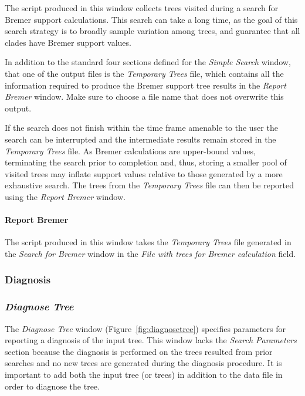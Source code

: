{The script produced in this window collects trees visited during a search for Bremer support calculations. This
search can take a long time, as the goal of this search strategy is to broadly sample variation among trees, and guarantee that all
clades have Bremer support values.  

In addition to the standard four sections defined for the \emph{Simple Search} window,
that one of the output files is the \emph{Temporary Trees} file, which 
contains all the information required to produce the Bremer support tree
results in the \emph{Report Bremer} window. Make sure to choose a file name that does not overwrite this output.

If the search does not finish within the time frame amenable to the user the search can be interrupted and the 
intermediate results remain stored in the \emph{Temporary Trees} file.  As Bremer calculations are upper-bound 
values, terminating the search prior to completion and, thus, storing a smaller pool of visited trees may inflate 
support values relative to those generated by a more exhaustive search. The trees from the \emph{Temporary Trees} 
file can then be reported using the \emph{Report Bremer} window.

\paragraph{Report Bremer}
The script produced in this window takes the \emph{Temporary Trees} file generated in the \emph{Search for Bremer} 
window in the \emph{File with trees for Bremer calculation} field. 

\subsubsection{Diagnosis}

\subsubsection*{\emph{Diagnose Tree}}

The \emph{Diagnose Tree} window (Figure~\ref{fig:diagnosetree}) specifies parameters for reporting a diagnosis 
of the input tree. This window lacks the \emph{Search Parameters} section because the diagnosis is performed on 
the trees resulted from prior searches and no new trees are generated during the diagnosis procedure. It is important 
to add both the input tree (or trees) in addition to the data file in order to diagnose the tree.

}
